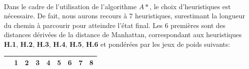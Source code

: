 \documentclass[10pt,a4paper]{report}
\begin{document}
\paragraph{} {Dans le cadre de l'utilisation de l'algorithme ${A*}$, le choix d'heuristiques est nécessaire. De fait, nous aurons recours à 7 heuristiques, surestimant la longueur du chemin à parcourir pour atteindre l'état final. Les 6 premières sont des distances dérivées de la distance de Manhattan, correspondant aux heuristiques {\bfseries H.1}, {\bfseries H.2}, {\bfseries H.3}, {\bfseries H.4}, {\bfseries H.5}, {\bfseries H.6} et pondérées par les jeux de poids suivants:}
{\scriptsize{}
\renewcommand{\arraystretch}{1.3}
\begin{center}
	\begin{tabular}
		{| c || c | c | c | c | c | c | c |} \hline & \textbf{1} & \textbf{2} & \textbf{3} & \textbf{4} & \textbf{5} & \textbf{6} & \textbf{7} & \textbf{8} \\

		\hline
	\end{tabular}
\end{center}}
\end{document}
